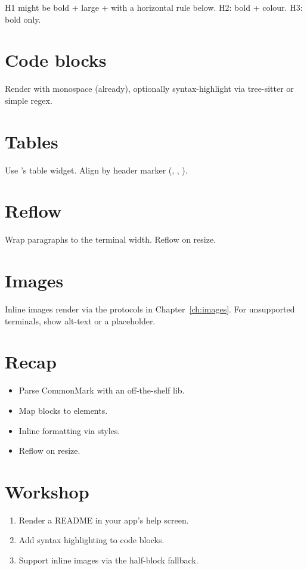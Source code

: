 H1 might be bold + large + with a horizontal rule below.
H2: bold + colour. H3: bold only.

\section{Code blocks}

Render with monospace (already), optionally syntax-highlight
via tree-sitter or simple regex.

\section{Tables}

Use \maya{}'s table widget. Align by header marker (\code{:--},
\code{:-:}, \code{--:}).

\section{Reflow}

Wrap paragraphs to the terminal width. Reflow on resize.

\section{Images}

Inline images render via the protocols in
Chapter~\ref{ch:images}. For unsupported terminals, show
alt-text or a placeholder.

\section{Recap}

\begin{recap}
\begin{itemize}[leftmargin=*]
  \item Parse CommonMark with an off-the-shelf lib.
  \item Map blocks to \maya{} elements.
  \item Inline formatting via styles.
  \item Reflow on resize.
\end{itemize}
\end{recap}

\section*{Workshop}

\begin{enumerate}[leftmargin=*]
  \item Render a README in your app's help screen.
  \item Add syntax highlighting to code blocks.
  \item Support inline images via the half-block fallback.
\end{enumerate}
